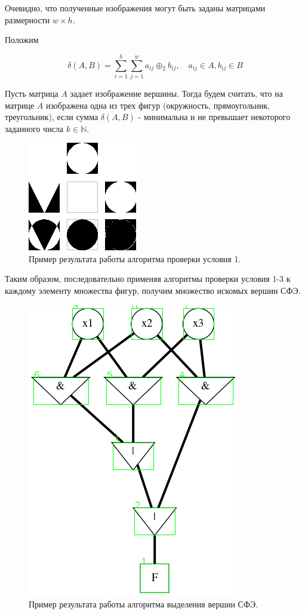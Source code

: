 \documentclass[makeidx, a4paper, 14pt]{extarticle}
\newcommand{\N}{\mathbb{N}}
\begin{document}
Очевидно, что полученные изображения могут быть заданы матрицами размерности ${w \times h}$.

Положим

\[
    \delta(A, B) = \sum_{i=1}^{h}\sum_{j=1}^{w} a_{ij} \oplus_2 b_{ij}, \quad a_{ij} \in A, b_{ij} \in B
\]

Пусть матрица $A$ задает изображение вершины. Тогда будем считать, что на матрице $A$ изображена одна из трех фигур (окружность, прямоугольник, треугольник),
если сумма $\delta(A, B)$ - минимальна и не превышает некоторого заданного числа $k \in \N$.

\begin{figure}[H]
    \centering
    \includegraphics[scale=4]{shape_diff.png}
    \caption{Пример результата работы алгоритма проверки условия 1.}
\end{figure}

Таким образом, последовательно применяя алгоритмы проверки условия 1-3 к каждому элементу множества фигур,
получим множество искомых вершин СФЭ.

\begin{figure}[H]
    \centering
    \includegraphics[scale=0.75]{img4_detected_vertices.png}
    \caption{Пример результата работы алгоритма выделения вершин СФЭ.}
\end{figure}
\end{document}
